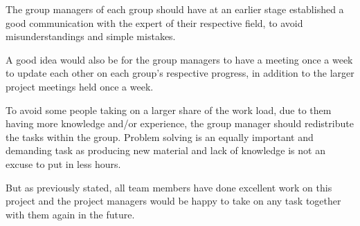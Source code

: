 \documentclass[a4paper]{article}
\begin{document}
The group managers of each group should have at an earlier stage established a good communication with the expert of their respective field, to avoid misunderstandings and simple mistakes. 

A good idea would also be for the group managers to have a meeting once a week to update each other on each group's respective progress, in addition to the larger project meetings held once a week. 

To avoid some people taking on a larger share of the work load, due to them having more knowledge and/or experience, the group manager should redistribute the tasks within the group. Problem solving is an equally important and demanding task as producing new material and lack of knowledge is not an excuse to put in less hours.

But as previously stated, all team members have done excellent work on this project and the project managers would be happy to take on any task together with them again in the future.
\end{document}
